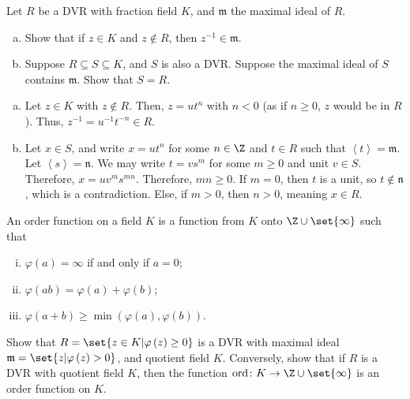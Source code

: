 \documentclass[10pt]{mypackage}
\begin{document}
\begin{exercise}[Exercise 2.26]\hfill
  Let $R$ be a DVR with fraction field $K$, and $\mathfrak{m}$ the maximal ideal of $R$.
  \begin{enumerate}[(a)]
    \item Show that if $z\in K$ and $z\notin R$, then $z^{-1}\in \mathfrak{m}$.
    \item Suppose $R\subseteq S\subseteq K$, and $S$ is also a DVR. Suppose the maximal ideal of $S$ contains $\mathfrak{m}$. Show that $S = R$.
  \end{enumerate}
\end{exercise}
\begin{solution}\hfill
  \begin{enumerate}[(a)]
    \item Let $z\in K$ with $z\notin R$. Then, $z = ut^{n}$ with $n < 0$ (as if $n \geq 0$, $z$ would be in $R$). Thus, $z^{-1} = u^{-1}t^{-n}\in R$.
    \item Let $x\in S$, and write $x = ut^{n}$ for some $n\in\Z$ and $t\in R$ such that $\left\langle t \right\rangle = \mathfrak{m}$. Let $\left\langle s \right\rangle = \mathfrak{n}$. We may write $t = vs^{m}$ for some $m\geq 0$ and unit $v\in S$. Therefore, $x = uv^{m}s^{mn}$. Therefore, $mn\geq 0$. If $m = 0$, then $t$ is a unit, so $t\notin \mathfrak{n}$, which is a contradiction. Else, if $m > 0$, then $n > 0$, meaning $x\in R$.
  \end{enumerate}
\end{solution}
\begin{exercise}
  An order function on a field $K$ is a function from $K$ onto $\Z\cup \set{\infty}$ such that
  \begin{enumerate}[(i)]
    \item $\varphi(a) = \infty$ if and only if $a = 0$;
    \item $\varphi\left( ab \right) = \varphi\left( a \right) + \varphi\left( b \right)$;
    \item $\varphi\left( a + b \right)\geq \min\left( \varphi\left( a \right),\varphi\left( b \right) \right)$.
  \end{enumerate}
  Show that $R = \set{z\in K | \varphi\left( z \right) \geq 0}$ is a DVR with maximal ideal $\mathfrak{m} = \set{z | \varphi\left( z \right) > 0}$, and quotient field $K$. Conversely, show that if $R$ is a DVR with quotient field $K$, then the function $\operatorname{ord}\colon K\rightarrow \Z\cup\set{\infty}$ is an order function on $K$.
\end{exercise}
\end{document}
